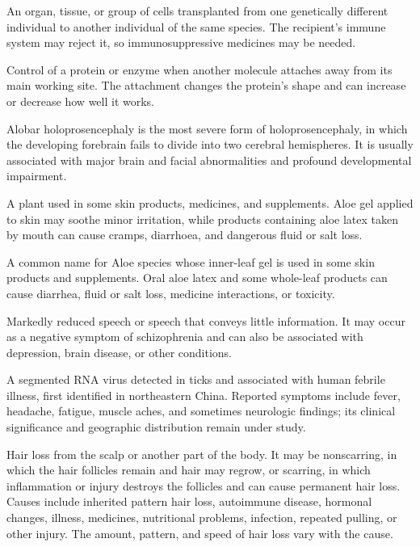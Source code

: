  An organ, tissue, or group of cells transplanted from one genetically different individual to another individual of the same species. The recipient’s immune system may reject it, so immunosuppressive medicines may be needed.

 Control of a protein or enzyme when another molecule attaches away from its main working site. The attachment changes the protein’s shape and can increase or decrease how well it works.

 Alobar holoprosencephaly is the most severe form of holoprosencephaly, in which the developing forebrain fails to divide into two cerebral hemispheres. It is usually associated with major brain and facial abnormalities and profound developmental impairment.

 A plant used in some skin products, medicines, and supplements. Aloe gel applied to skin may soothe minor irritation, while products containing aloe latex taken by mouth can cause cramps, diarrhoea, and dangerous fluid or salt loss.

 A common name for Aloe species whose inner-leaf gel is used in some skin products and supplements. Oral aloe latex and some whole-leaf products can cause diarrhea, fluid or salt loss, medicine interactions, or toxicity.

 Markedly reduced speech or speech that conveys little information. It may occur as a negative symptom of schizophrenia and can also be associated with depression, brain disease, or other conditions.

 A segmented RNA virus detected in ticks and associated with human febrile illness, first identified in northeastern China. Reported symptoms include fever, headache, fatigue, muscle aches, and sometimes neurologic findings; its clinical significance and geographic distribution remain under study.

 Hair loss from the scalp or another part of the body. It may be nonscarring, in which the hair follicles remain and hair may regrow, or scarring, in which inflammation or injury destroys the follicles and can cause permanent hair loss. Causes include inherited pattern hair loss, autoimmune disease, hormonal changes, illness, medicines, nutritional problems, infection, repeated pulling, or other injury. The amount, pattern, and speed of hair loss vary with the cause.

